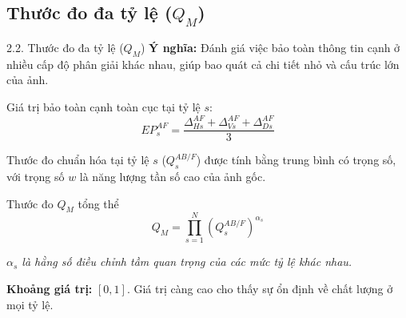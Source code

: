 \documentclass{beamer}
\begin{document}
\subsection{Thước đo đa tỷ lệ ($Q_M$)}
\begin{frame}{2.2. Thước đo đa tỷ lệ ($Q_M$)}
    \textbf{Ý nghĩa:} Đánh giá việc bảo toàn thông tin cạnh ở nhiều cấp độ phân giải khác nhau, giúp bao quát cả chi tiết nhỏ và cấu trúc lớn của ảnh.

    \vspace{0.2cm}
    Giá trị bảo toàn cạnh toàn cục tại tỷ lệ $s$:
    \begin{equation}
        EP^{AF}_s = \frac{\Delta^{AF}_{Hs} + \Delta^{AF}_{Vs} + \Delta^{AF}_{Ds}}{3}
    \end{equation}

    Thước đo chuẩn hóa tại tỷ lệ $s$ ($Q_s^{AB/F}$) được tính bằng trung bình có trọng số, với trọng số $w$ là năng lượng tần số cao của ảnh gốc.

    \begin{block}{Thước đo $Q_M$ tổng thể}
    \begin{equation}
        Q_M = \prod_{s=1}^N \left( Q_s^{AB/F} \right)^{\alpha_s}
    \end{equation}
    \end{block}
    \footnotesize{\textit{$\alpha_s$ là hằng số điều chỉnh tầm quan trọng của các mức tỷ lệ khác nhau.}}

    \vspace{0.3cm}
    \textbf{Khoảng giá trị:} $[0, 1]$. Giá trị càng cao cho thấy sự ổn định về chất lượng ở mọi tỷ lệ.
\end{frame}
\end{document}
